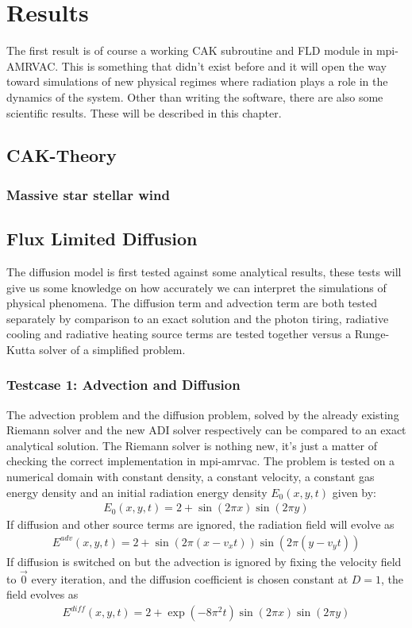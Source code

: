 \chapter{Results}
The first result is of course a working CAK subroutine and FLD module in mpi-AMRVAC. This is something that didn't exist before and it will open the way toward simulations of new physical regimes where radiation plays a role in the dynamics of the system. Other than writing the software, there are also some scientific results. These will be described in this chapter.

\section{CAK-Theory}
\subsection{Massive star stellar wind}

\section{Flux Limited Diffusion}
The diffusion model is first tested against some analytical results, these tests will give us some knowledge on how accurately we can interpret the simulations of physical phenomena. The diffusion term and advection term are both tested separately by comparison to an exact solution and the photon tiring, radiative cooling and radiative heating source terms are tested together versus a Runge-Kutta solver of a simplified problem.

\subsection{Testcase 1: Advection and Diffusion}
The advection problem and the diffusion problem, solved by the already existing Riemann solver and the new ADI solver respectively can be compared to an exact analytical solution. The Riemann solver is nothing new, it's just a matter of checking the correct implementation in mpi-amrvac. The problem is tested on a numerical domain with constant density, a constant velocity, a constant gas energy density and an initial radiation energy density $E_0(x,y,t)$ given by:
\begin{align}
E_0(x,y,t) = 2 + \sin(2 \pi x) \sin(2 \pi y)
\end{align}
If diffusion and other source terms are ignored, the radiation field will evolve as
\begin{align}
E^{adv}(x,y,t) = 2 + \sin(2 \pi (x-v_x t)) \sin(2 \pi (y-v_y t))
\end{align}
If diffusion is switched on but the advection is ignored by fixing the velocity field to $\vec{0}$ every iteration, and the diffusion coefficient is chosen constant at $D = 1$, the field evolves as
\begin{align}
E^{diff}(x,y,t) = 2 + \exp(-8 \pi^2 t) \sin(2 \pi x) \sin(2 \pi y)
\end{align}

